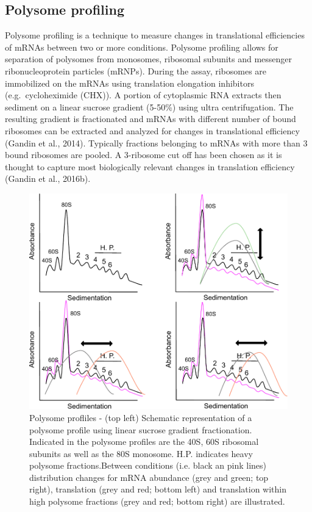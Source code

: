 \documentclass[12pt,openany]{book}
\begin{document}
\subsection{Polysome profiling}

Polysome profiling is a technique to measure changes in translational
efficiencies of mRNAs between two or more conditions. Polysome profiling
allows for separation of polysomes from monosomes, ribosomal subunits
and messenger ribonucleoprotein particles (mRNPs). During the assay,
ribosomes are immobilized on the mRNAs using translation elongation
inhibitors (e.g.~cycloheximide (CHX)). A portion of cytoplasmic RNA
extracts then sediment on a linear sucrose gradient (5-50\%) using ultra
centrifugation. The resulting gradient is fractionated and mRNAs with
different number of bound ribosomes can be extracted and analyzed for
changes in translational efficiency (Gandin et al., 2014). Typically
fractions belonging to mRNAs with more than 3 bound ribosomes are
pooled. A 3-ribosome cut off has been chosen as it is thought to capture
most biologically relevant changes in translation efficiency (Gandin et
al., 2016b).

\begin{figure}
    \includegraphics[width=0.9\linewidth]{./figures/polysome_shifts.pdf}
  \caption{Polysome profliles -  (top left) Schematic representation of a polysome profile using linear sucrose gradient fractionation. Indicated in the polysome profiles are the 40S, 60S ribosomal subunits as well as the 80S monosome. H.P. indicates heavy polysome fractions.Between conditions (i.e. black an pink lines) distribution changes for mRNA abundance (grey and green; top right), translation (grey and red; bottom left) and translation within high polysome fractions (grey and red; bottom right) are illustrated. \label{fig:polysome}}
\end{figure}
\end{document}
